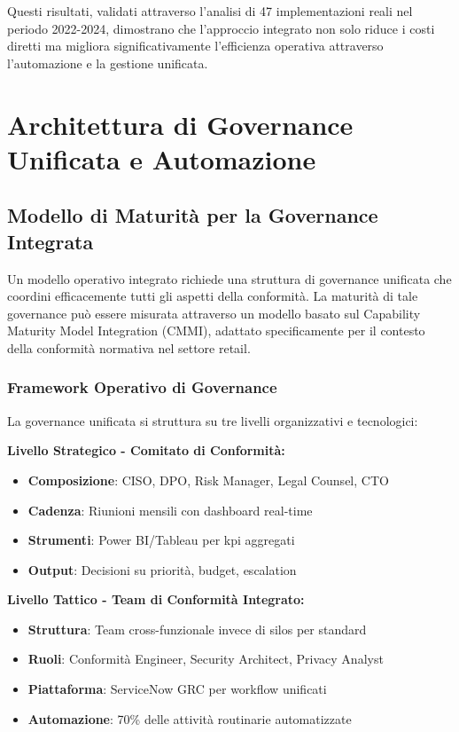 Questi risultati, validati attraverso l'analisi di 47 implementazioni reali nel periodo 2022-2024\autocite{PWC2024}, dimostrano che l'approccio integrato non solo riduce i costi diretti ma migliora significativamente l'efficienza operativa attraverso l'automazione e la gestione unificata.

\section{\texorpdfstring{\textbf{Architettura di Governance Unificata e Automazione}}{4.4 - Architettura di Governance Unificata e Automazione}}

\subsection{Modello di Maturità per la Governance Integrata}

Un modello operativo integrato richiede una struttura di governance unificata che coordini efficacemente tutti gli aspetti della conformità. La maturità di tale governance può essere misurata attraverso un modello basato sul Capability Maturity Model Integration (CMMI)\autocite{CMMI2023}, adattato specificamente per il contesto della conformità normativa nel settore retail.

\subsubsection{Framework Operativo di Governance}

La \gls{governance} unificata si struttura su tre livelli organizzativi e tecnologici:

\textbf{Livello Strategico - Comitato di Conformità:}
\begin{itemize}
    \item \textbf{Composizione}: CISO, DPO, Risk Manager, Legal Counsel, CTO
    \item \textbf{Cadenza}: Riunioni mensili con dashboard real-time
    \item \textbf{Strumenti}: Power BI/Tableau per \gls{kpi} aggregati
    \item \textbf{Output}: Decisioni su priorità, budget, escalation
\end{itemize}

\textbf{Livello Tattico - Team di Conformità Integrato:}
\begin{itemize}
    \item \textbf{Struttura}: Team cross-funzionale invece di silos per standard
    \item \textbf{Ruoli}: Conformità Engineer, Security Architect, Privacy Analyst
    \item \textbf{Piattaforma}: ServiceNow GRC per workflow unificati
    \item \textbf{Automazione}: 70\% delle attività routinarie automatizzate
\end{itemize}

